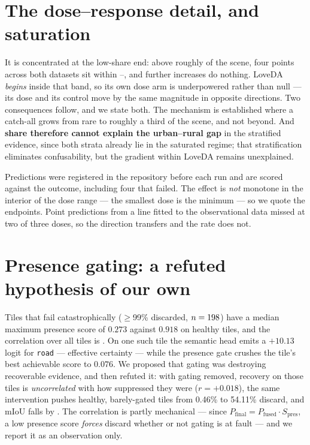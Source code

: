\documentclass[10pt,a4paper]{article}                        %
\newcommand{\best}[1]{\textbf{#1}}
\begin{document}

\section{The dose--response detail, and saturation}
\label{sup:saturate}
 It is concentrated at
the low-share end: above roughly \ivSatShare{} of the scene, four points across
both datasets sit within \ivSatLo{}--\ivSatHi{}, and further increases do nothing.
LoveDA \emph{begins} inside that band, so its own dose arm is underpowered rather
than null --- its dose and its control move by the same magnitude in opposite
directions. Two consequences follow, and we state both. The mechanism is
established where a catch-all grows from rare to roughly a third of the scene, and
not beyond. And \best{share therefore cannot explain the urban--rural gap} in the
stratified evidence, since both strata already lie in the saturated regime; that
stratification eliminates confusability, but the gradient within LoveDA remains
unexplained.

Predictions were registered in the repository before each run and are scored
against the outcome, including four that failed. The effect is
\emph{not} monotone in the interior of the dose range --- the smallest dose is the
minimum --- so we quote the endpoints. Point predictions from a line fitted to the
observational data missed at two of three doses, so the direction transfers and
the rate does not.


\section{Presence gating: a refuted hypothesis of our own}
\label{sup:presence}
 Tiles that fail
catastrophically ($\ge$99\% discarded, $n=198{}$) have a
median maximum presence score of $0.273$ against $0.918$ on healthy tiles, and
the correlation over all \loveTiles{} tiles is \presCorrLove{}. On one such tile
the semantic head emits a $+10.13$ logit for \texttt{road} --- effective
certainty --- while the presence gate crushes the tile's best achievable score to
$0.076$. We proposed that gating was destroying recoverable evidence, and then
refuted it: with gating removed, recovery on those tiles is \emph{uncorrelated}
with how suppressed they were ($r=+0.018$), the same intervention pushes healthy,
barely-gated tiles from 0.46\% to 54.11\% discard, and
mIoU falls by \presCost{}. The correlation is partly mechanical --- since
$P_{\text{final}} = P_{\text{fused}}\cdot S_{\text{pres}}$, a low presence score
\emph{forces} discard whether or not gating is at fault --- and we report it as an
observation only.
\end{document}
